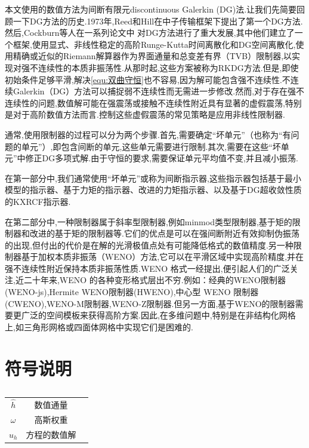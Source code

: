 \documentclass{book}
\begin{document}
本文使用的数值方法为间断有限元discontinuous Galerkin (DG)法.让我们先简要回顾一下DG方法的历史.1973年,Reed和Hill\cite{Reed_Hill}在中子传输框架下提出了第一个DG方法.然后,Cockburn等人在一系列论文中 \cite{RKDG2,RKDG3,RKDG4,RKDG5} 对DG方法进行了重大发展,其中他们建立了一个框架,使用显式、非线性稳定的高阶Runge-Kutta时间离散化和DG空间离散化,使用精确或近似的Riemann解算器作为界面通量和总变差有界（TVB）限制器\cite{TVB},以实现对强不连续性的本质非振荡性.从那时起,这些方案被称为RKDG方法.但是,即使初始条件足够平滑,解决\eqref{equ:双曲守恒}也不容易,因为解可能包含强不连续性.不连续Galerkin（DG）方法可以捕捉弱不连续性而无需进一步修改.然而,对于存在强不连续性的问题,数值解可能在强震荡或接触不连续性附近具有显著的虚假震荡,特别是对于高阶数值方法而言.控制这些虚假震荡的常见策略是应用非线性限制器.

通常,使用限制器的过程可以分为两个步骤.首先,需要确定“坏单元”（也称为“有问题的单元”）,即包含间断的单元,这些单元需要进行限制.其次,需要在这些“坏单元”中修正DG多项式解.由于守恒的要求,需要保证单元平均值不变,并且减小振荡.

在第一部分中,我们通常使用“坏单元”或称为间断指示器,这些指示器包括基于最小模型的指示器\cite{RKDG2}、基于力矩的指示器\cite{基于力矩的指示器}、改进的力矩指示器\cite{改进的基于矩的限制器}、以及基于DG超收敛性质的KXRCF指示器\cite{基于DG超收敛性质的KXRCF指示器}.

在第二部分中,一种限制器属于斜率型限制器,例如minmod类型限制器\cite{RKDG2,RKDG3,RKDG4,RKDG5},基于矩的限制器\cite{基于矩的限制器}和改进的基于矩的限制器\cite{改进的基于矩的限制器}等.它们的优点是可以在强间断附近有效抑制伪振荡的出现,但付出的代价是在解的光滑极值点处有可能降低格式的数值精度.另一种限制器基于加权本质非振荡（WENO）方法\cite{WENO1,WENO2,WENO3,WENO4,WENO5},它可以在平滑区域中实现高阶精度,并在强不连续性附近保持本质非振荡性质.WENO 格式一经提出,便引起人们的广泛关注,近二十年来,WENO 的各种变形格式层出不穷.例如：经典的WENO限制器(WENO-js)\cite{WENO-js1,WENO-js2},Hermite WENO限制器(HWENO)\cite{HWENO1,HWENO2},中心型 WENO 限制器(CWENO)\cite{CWENO},WENO-M限制器\cite{WENO-M},WENO-Z限制器\cite{WENO-Z}.但另一方面,基于WENO的限制器需要更广泛的空间模板来获得高阶方案.因此,在多维问题中,特别是在非结构化网格上,如三角形网格或四面体网格中实现它们是困难的.

\section{符号说明}
\begin{table}[htbp]
    \centering
    \label{table:}
    \caption{}
    \begin{tabular}{ccc}
        \toprule
                  &              & \\
        \midrule
        $\hat{h}$ & 数值通量     & \\
        $\omega$  & 高斯权重     & \\
        $u_h$     & 方程的数值解 & \\
        \bottomrule
    \end{tabular}
\end{table}
\end{document}

